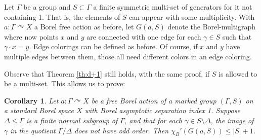 \documentclass[10pt,a4paper]{article}
\newcommand{\0}{\varnothing}
\newtheorem{corollary}{Corollary}
\begin{document}
Let $\Gamma$ be a group and $S \subset \Gamma$ a finite symmetric multi-set of generators for it not containing 1. That is, the elements of $S$ can appear with some multiplicity. With $a:\Gamma \curvearrowright X$ a Borel free action as before, let $G(a,S)$ denote the Borel-multigraph where now points $x$ and $y$ are connected with one edge for each $\gamma \in S$ such that $\gamma \cdot x = y$. Edge colorings can be defined as before. Of course, if $x$ and $y$ have multiple edges between them, those all need different colors in an edge coloring.

Observe that Theorem \ref{th:d+1} still holds, with the same proof, if $S$ is allowed to be a multi-set. This allows us to prove:

\begin{corollary}\label{cor:d+1}
Let $a:\Gamma \curvearrowright X$ be a free Borel action of a marked group $(\Gamma,S)$ on a standard Borel space $X$ with Borel asymptotic separation index 1. Suppose $\Delta \leq \Gamma$ is a finite normal subgroup of $\Gamma$, and that for each $\gamma \in S \setminus \Delta$, the image of $\gamma$ in the quotient $\Gamma/\Delta$ does not have odd order. Then $\chi_B'(G(a,S)) \leq |S|+1$.
\end{corollary}
\end{document}
